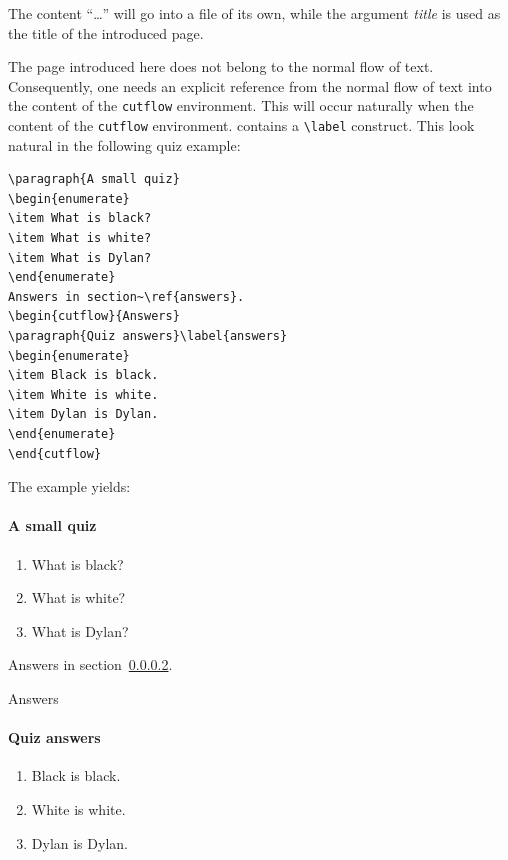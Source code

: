 \noindent The content ``\ldots'' will go into a file of its
own, while
the argument \textit{title} is used as the title of the introduced
\html{} page.

The \html{} page introduced here does not belong to the normal flow of
text.
Consequently, one needs an explicit reference from the normal flow of text
into the content of the \verb+cutflow+ environment.
This will occur naturally when the content of the \verb+cutflow+ environment.
contains a \verb+\label+ construct.
This look natural in the following quiz example:
\begin{verbatim}
\paragraph{A small quiz}
\begin{enumerate}
\item What is black?
\item What is white?
\item What is Dylan?
\end{enumerate}
Answers in section~\ref{answers}.
\begin{cutflow}{Answers}
\paragraph{Quiz answers}\label{answers}
\begin{enumerate}
\item Black is black.
\item White is white.
\item Dylan is Dylan.
\end{enumerate}
\end{cutflow}
\end{verbatim}
\ifhevea The example yields:
\paragraph{A small quiz}
\begin{enumerate}
\item What is black?
\item What is white?
\item What is Dylan?
\end{enumerate}
Answers in section~\ref{answers}.
\begin{cutflow}{Answers}
\paragraph{Quiz answers}\label{answers}
\begin{enumerate}
\item Black is black.
\item White is white.
\item Dylan is Dylan.
\end{enumerate}
\end{cutflow}
\fi

